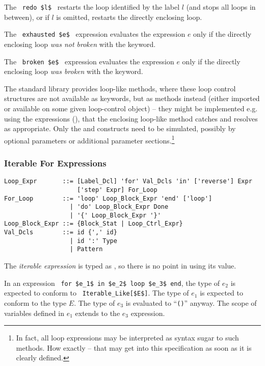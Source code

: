 The ~\lstinline!redo $l$!~ restarts the loop identified by the label $l$ (and stops all loops in between), or if $l$ is omitted, restarts the directly enclosing loop. 

The ~\lstinline!exhausted $e$!~ expression evaluates the expression $e$ only if the directly enclosing loop {\em was not broken} with the  keyword. 

The ~\lstinline!broken $e$!~ expression evaluates the expression $e$ only if the directly enclosing loop {\em was broken} with the  keyword. 

The standard library provides loop-like methods, where these loop control structures are not available as keywords, but as methods instead (either imported or available on some given loop-control object) -- they might be implemented e.g. using the  expressions (), that the enclosing loop-like method catches and resolves as appropriate. Only the  and  constructs need to be simulated, possibly by optional parameters or additional parameter sections.\footnote{In fact, all loop expressions may be interpreted as syntax sugar to such methods. How exactly -- that may get into this specification as soon as it is clearly defined.} 





\subsubsection{Iterable For Expressions}
\label{sec:iterable-expressions}

\syntax\begin{lstlisting}
Loop_Expr       ::= [Label_Dcl] 'for' Val_Dcls 'in' ['reverse'] Expr 
                    ['step' Expr] For_Loop
For_Loop        ::= 'loop' Loop_Block_Expr 'end' ['loop']
                  | 'do' Loop_Block_Expr Done
                  | '{' Loop_Block_Expr '}'
Loop_Block_Expr ::= {Block_Stat | Loop_Ctrl_Expr}
Val_Dcls        ::= id {',' id}
                  | id ':' Type
                  | Pattern
\end{lstlisting}

The {\em iterable expression} is typed as , so there is no point in using its value. 

In an expression ~\lstinline!for $e_1$ in $e_2$ loop $e_3$ end!, the type of $e_2$ is expected to conform to ~\lstinline!Iterable_Like[$E$]!. The type of $e_1$ is expected to conform to the type $E$. The type of $e_3$ is evaluated to ``\lstinline!()!'' anyway. The scope of variables defined in $e_1$ extends to the $e_3$ expression. 

